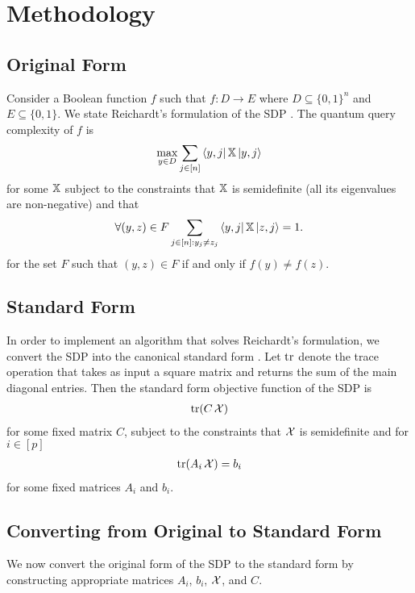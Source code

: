 \section{Methodology}\label{sec:method}

\subsection{Original Form}
Consider a Boolean function $f$ such that
$f: D \rightarrow E$ where 
$D \subseteq {\{0,1\}}^n$ and $E \subseteq {\{0,1\}}$.
We state Reichardt's formulation of the SDP \cite{reichardt2009span}.
The quantum query complexity of $f$ is
\begin{align} \label{Eq:reichardt_obj} 
    \max_{y \in D} \sum_{j \in [n]} \bra{y,j}\operatorname{\mathbb{X}}\ket{y,j} 
\end{align}
for some $\operatorname{\mathbb{X}}$ subject to the constraints that $\operatorname{\mathbb{X}}$ is semidefinite
(all its eigenvalues are non-negative)
and that
\begin{align}\label{Eq:reichardt_F0}
    \forall (y,z) \in F \sum_{j \in [n]: y_j \ne z_j} 
    \bra{y,j} \operatorname{\mathbb{X}} \ket{z, j} = 1.
\end{align}
for the set $F$ such that $(y,z) \in F$ if and only if
$f(y) \neq f(z)$.

\subsection{Standard Form}
In order to implement an algorithm that solves 
Reichardt's formulation, we convert the SDP
into the canonical standard form
\cite{boyd2004convex}.
Let $\operatorname{\text{tr}}$ denote the trace operation
that takes as input a square matrix
and returns the sum of the main diagonal entries.
Then the standard form objective function of the SDP is
\begin{align}\label{Eq:boyd_obj}
    \operatorname{\text{tr}}(C\operatorname{\mathcal{X}})
\end{align}
for some fixed matrix $C$, subject to the constraints
that $\operatorname{\mathcal{X}}$ is semidefinite and for $i \in [p]$
\begin{align} \label{Eq:boyd_trace}
    \operatorname{\text{tr}}(A_i \operatorname{\mathcal{X}}) = b_i
\end{align}
for some fixed matrices $A_i$ and $b_i$.

\subsection{Converting from Original to Standard Form}
We now convert the original form of the SDP to
the standard form by constructing appropriate matrices $A_i$, $b_i$, $\operatorname{\mathcal{X}}$, and $C$.

